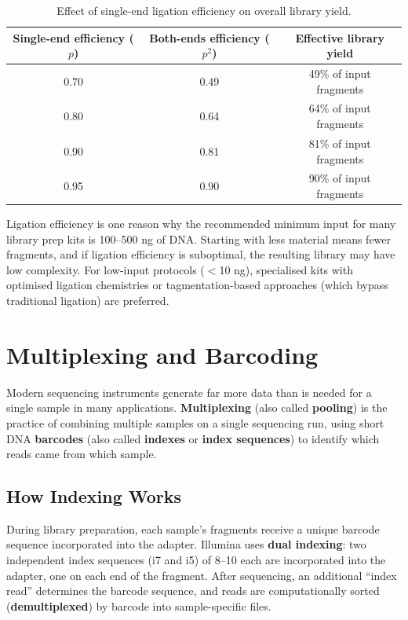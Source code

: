 \begin{table}[htbp]
\centering
\caption{Effect of single-end ligation efficiency on overall library yield.}
\label{tab:seqprinciples:ligation-efficiency}
\small
\begin{tabular}{ccc}
\toprule
\textbf{Single-end efficiency ($p$)} & \textbf{Both-ends efficiency ($p^2$)} & \textbf{Effective library yield} \\
\midrule
0.70 & 0.49 & 49\% of input fragments \\
0.80 & 0.64 & 64\% of input fragments \\
0.90 & 0.81 & 81\% of input fragments \\
0.95 & 0.90 & 90\% of input fragments \\
\bottomrule
\end{tabular}
\end{table}

\begin{tipbox}
Ligation efficiency is one reason why the recommended minimum input for many library prep kits is 100--500 ng of DNA. Starting with less material means fewer fragments, and if ligation efficiency is suboptimal, the resulting library may have low complexity. For low-input protocols ($<$10 ng), specialised kits with optimised ligation chemistries or tagmentation-based approaches (which bypass traditional ligation) are preferred.
\end{tipbox}


\section{Multiplexing and Barcoding}
\label{sec:seqprinciples:multiplexing}

Modern sequencing instruments generate far more data than is needed for a single sample in many applications. \textbf{Multiplexing} (also called \textbf{pooling}) is the practice of combining multiple samples on a single sequencing run, using short DNA \textbf{barcodes} (also called \textbf{indexes} or \textbf{index sequences}) to identify which reads came from which sample.

\subsection{How Indexing Works}
\label{subsec:seqprinciples:indexing}

During library preparation, each sample's fragments receive a unique barcode sequence incorporated into the adapter. Illumina uses \textbf{dual indexing}: two independent index sequences (i7 and i5) of 8--10\basepair{} each are incorporated into the adapter, one on each end of the fragment. After sequencing, an additional ``index read'' determines the barcode sequence, and reads are computationally sorted (\textbf{demultiplexed}) by barcode into sample-specific files.

